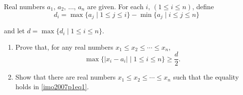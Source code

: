 Real numbers $ a_{1}$,  $ a_{2}$,  $ \ldots$,  $ a_{n}$ are given. For each $ i$,  $ (1 \leq i \leq n )$,  define\[ d_{i} = \max \{ a_{j}\mid 1 \leq j \leq i \} - \min \{ a_{j}\mid i \leq j \leq n \}
\]

and let $ d = \max \{d_{i}\mid 1 \leq i \leq n \}$.

\begin{enumerate}[label = (\alph*)]
	\item Prove that, for any real numbers $x_{1}\leq x_{2}\leq \cdots \leq x_{n}$, 
		\begin{equation}\label{imo2007p1eq1}\tag{$*$}
			\max \{ |x_{i} - a_{i}| \mid 1 \leq i \leq n \}\geq \frac {d}{2}.
		\end{equation}

	\item Show that there are real numbers $ x_{1}\leq x_{2}\leq \cdots \leq x_{n}$ such that the equality holds in \cref{imo2007p1eq1}.
\end{enumerate}

